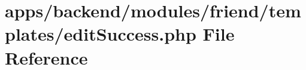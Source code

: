 \hypertarget{backend_2modules_2friend_2templates_2edit_success_8php}{\section{apps/backend/modules/friend/templates/edit\-Success.php File Reference}
\label{backend_2modules_2friend_2templates_2edit_success_8php}
}
